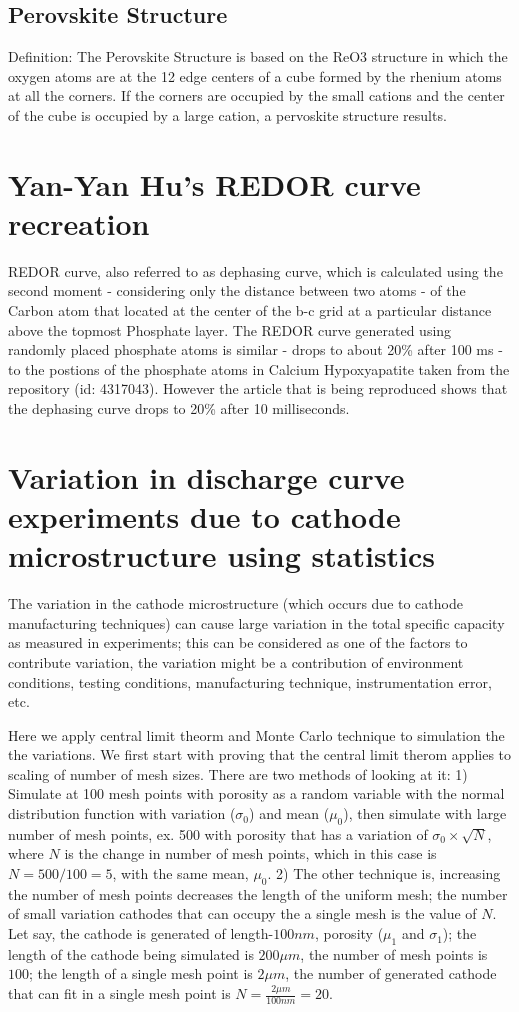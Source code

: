 \documentclass[12pt]{book}
\begin{document}
\subsection{Perovskite Structure}
Definition: The Perovskite Structure is based on the ReO3 structure in which the oxygen atoms are at the 12 edge centers of a cube formed by the rhenium atoms at all the corners. If the corners are occupied by the small cations and the center of the cube is occupied by a large cation, a pervoskite structure results.
\section{Yan-Yan Hu's REDOR curve recreation}
REDOR curve, also referred to as dephasing curve, which is calculated using the second moment - considering only the distance between two atoms - of the Carbon atom that located at the center of the b-c grid at a particular distance above the topmost Phosphate layer. The REDOR curve generated using randomly placed phosphate atoms is similar -
drops to about 20\% after 100 ms - to the postions of the phosphate atoms in Calcium Hypoxyapatite taken from the repository (id: 4317043). However the article that is being reproduced shows that the dephasing curve drops to 20\% after 10 milliseconds. 
\section{Variation in discharge curve experiments due to cathode microstructure
	using statistics}
The variation in the cathode microstructure (which occurs due to cathode manufacturing techniques) can cause large variation in the total specific capacity as measured in experiments; this can be considered as one of the factors to contribute variation, the variation might be a contribution of environment conditions, testing conditions, manufacturing technique, instrumentation error, etc. 

Here we apply central limit theorm and Monte Carlo technique to simulation the the variations. We first start with proving that the central limit therom applies to scaling of number of mesh sizes. There are two methods of looking at it: 1) Simulate at 100 mesh points with porosity as a random variable with the normal distribution function with variation
($\sigma_{0}$) and mean ($\mu_{0}$), then simulate with large number of mesh points, ex. 500 with porosity that has a variation of $\sigma_{0}\times\sqrt{N}$, where $N$ is the change in number of mesh points, which in this case is $N=500/100=5$, with the same mean, $\mu_{0}$. 2) The other technique is, increasing the number of mesh points decreases the length of the uniform mesh; the number of small variation cathodes that can occupy the a single mesh is the value of $N$. Let say, the cathode is generated of length-$100nm$, porosity ($\mu_{1}$ and $\sigma_{1}$); the length
of the cathode being simulated is $200\mu m$, the number of mesh points is $100$; the length of a single mesh point is $2\mu m$, the number of generated cathode that can fit in a single mesh point is $N=\frac{2\mu m}{100nm}=20.$ 
\end{document}
